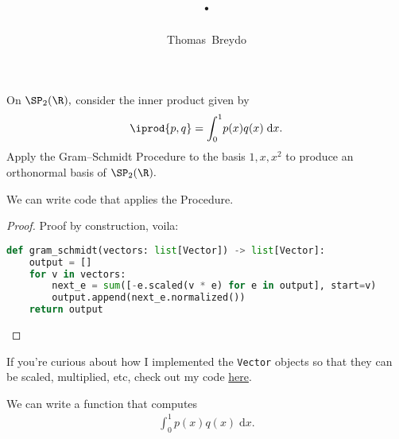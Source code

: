 \documentclass{amsart}
\title{\pagenum.\probnum}
\author{Thomas\ Breydo}
\begin{document}
\maketitle

\begin{problem*}
On $\SP_2(\R),$ consider the inner product given by
\begin{align*}
    \iprod{p,q}=\int_0^1\!p(x)q(x)\;\mathrm dx.
\end{align*}
Apply the Gram--Schmidt Procedure to the basis $1,x,x^2$ to produce an
orthonormal basis of $\SP_2(\R).$
\end{problem*}

\vspace{0.5in}

\begin{claim*}
    We can write code that applies the Procedure.
\end{claim*}
\begin{proof}
Proof by construction, voila:


\lstset{style=mystyle}

\begin{lstlisting}[language=Python]
def gram_schmidt(vectors: list[Vector]) -> list[Vector]:
    output = []
    for v in vectors:
        next_e = sum([-e.scaled(v * e) for e in output], start=v)
        output.append(next_e.normalized())
    return output
\end{lstlisting}
\end{proof}

\begin{note*}
If you're curious about how I implemented the \texttt{Vector} objects
so that they can be scaled, multiplied, etc, check out
my code \href{https://github.com/thomasbreydo/pylinearalg/blob/main/pylinearalg/vector.py}
{here}.
\end{note*}

\vspace{0.5in}

\begin{claim*}
We can write a function that computes
\begin{align*}
    \int_0^1{\!p(x)q(x)\;\mathrm dx}.
\end{align*}
\end{claim*}
\end{document}
